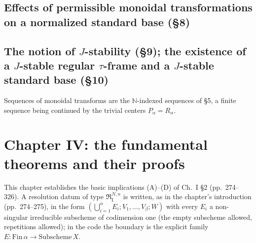 
\section{Effects of permissible monoidal transformations on a normalized standard base (\S8)}







\section{The notion of $J$-stability (\S9); the existence of a $J$-stable regular $\tau$-frame and a $J$-stable standard base (\S10)}

Sequences of monoidal transforms are the $\mathbb N$-indexed sequences of \S5, a finite sequence
being continued by the trivial centers $P_\alpha=R_\alpha$.





\chapter{Chapter IV: the fundamental theorems and their proofs}

This chapter establishes the basic implications (A)--(D) of Ch.~I \S2 (pp.~274--326).  A
resolution datum of type $\mathfrak R^{N,n}_{\mathrm I}$ is written, as in the chapter's
introduction (pp.~274--275), in the form
$(\bigcup_{i=1}^{\alpha}E_i;V_1,\dots,V_\beta;W)$ with every $E_i$ a non-singular irreducible
subscheme of codimension one (the empty subscheme allowed, repetitions allowed); in the code
the boundary is the explicit family $E\colon\mathrm{Fin}\,\alpha\to\mathrm{Subscheme}\,X$.

